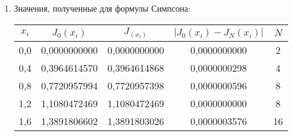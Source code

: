 \documentclass[a4paper,12pt]{article}
\begin{document}
{\begin{enumerate}[label = \arabic*.]
\begin{enumerate}
{            \begin{equation}
                L_n(x) = \sum_{i=0}^{n}f(x_i)\prod_{i \ne j, j = 0}^{n}\frac{x - x_j}{x_i - x_j}
            \end{equation}
            По трём узлам $(x_1 = a, x_2 = \dfrac{a+b}{2}, x_3 = b):
            L_2 = f(a)\left(\dfrac{x - \dfrac{a+b}{2}}{a - \dfrac{a+b}{2}}\right)\left(\dfrac{x - b}{a - b}\right)+\\
            f\left(\dfrac{a +b}{2}\right)\left(\dfrac{x-a}{\dfrac{a+b}{2} - a}\right)\left(\dfrac{x-b}{\dfrac{a+b}{2} - b}\right)+ f(b)\left(\dfrac{x - \dfrac{a+b}{2}}{b - \dfrac{a+b}{2}}\right)\left(\dfrac{x - b}{b - a}\right).$\\
            \hfill\break
            Проинтегрируем выражение по интервалу [a,b]:
            \begin{equation}
                \int\limits_{a}^{b}L_2(x)\mathrm{d}x = f(a)c_1 + f\left(\frac{a+b}{2}\right)c_2 + f(b)c_3
            \end{equation}
            где $c_1 = \dfrac{b-a}{6}, c_2 = \dfrac{2}{3}(b - a), c_3 = \dfrac{b-a}{6}.$\\
            \hfill\break
            Тогда:
            \begin{equation}
                \int\limits_{a}^{b}L_2(x)\mathrm{d}x = \frac{b-a}{6}\left(f(a) + 4f\left(\frac{a+b}{2}\right)+f(b)\right)
            \end{equation}
            \clearpage
            }
            \item {Значения, полученные для формулы Симпсона:
            \begin{table}[h]
            \centering
            \begin{tabular}{|c|c|c|c|c|}
                \hline
                $x_i$ & $J_0(x_i)$ & $J_(x_i)$ & $\left|J_0(x_i) - J_N(x_i)\right|$ & $N$\\
                \hline
                0,0 & 0,0000000000 & 0,0000000000 & 0,0000000000 & 2 \\
                \hline
                0,4 & 0,3964614570 & 0,3964614868 & 0,0000000298 & 4 \\
                \hline
                0,8 & 0,7720957994 & 0,7720957398 & 0,0000000596 & 8 \\
                \hline
                1,2 & 1,1080472469 & 1,1080472469 & 0,0000000000 & 8 \\
                \hline
                1,6 & 1,3891806602 & 1,3891803026 & 0,0000003576 & 16 \\

\end{tabular}
\end{table}}
\end{enumerate}
\end{enumerate}}
\end{document}
